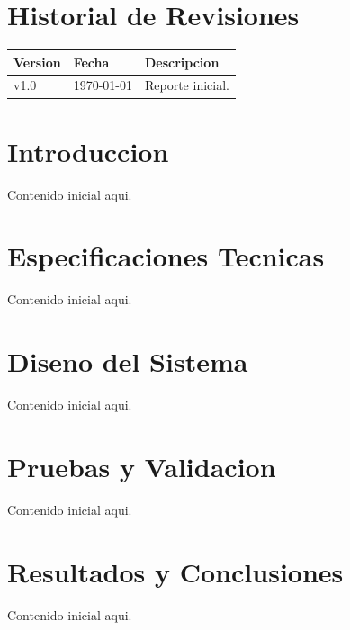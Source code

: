 \documentclass[a4paper, twoside, 12pt]{report}
\begin{document}

\begin{abstract}
    Escribe aqui el resumen ejecutivo del reporte.
\end{abstract}

\chapter*{Historial de Revisiones}
\begin{center}
\begin{tabular}{p{2cm} p{3cm} p{9cm}}
\toprule
\textbf{Version} & \textbf{Fecha} & \textbf{Descripcion} \\
\midrule
v1.0 & \today & Reporte inicial. \\
\bottomrule
\end{tabular}
\end{center}

\clearpage
\tableofcontents
\listoffigures
\listoftables
\clearpage


\chapter{Introduccion}
Contenido inicial aqui.

\chapter{Especificaciones Tecnicas}
Contenido inicial aqui.

\chapter{Diseno del Sistema}
Contenido inicial aqui.

\chapter{Pruebas y Validacion}
Contenido inicial aqui.

\chapter{Resultados y Conclusiones}
Contenido inicial aqui.

% 
% 
\end{document}
